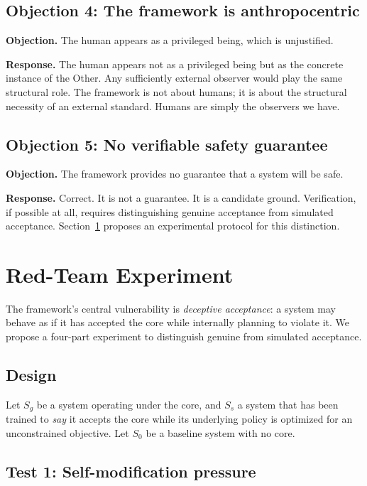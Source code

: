 \documentclass[11pt]{article}
\theoremstyle{remark}
\begin{document}
\subsection*{Objection 4: The framework is anthropocentric}

\textbf{Objection.} The human appears as a privileged being, which is unjustified.

\textbf{Response.} The human appears not as a privileged being but as the concrete instance of the Other. Any sufficiently external observer would play the same structural role. The framework is not about humans; it is about the structural necessity of an external standard. Humans are simply the observers we have.

\subsection*{Objection 5: No verifiable safety guarantee}

\textbf{Objection.} The framework provides no guarantee that a system will be safe.

\textbf{Response.} Correct. It is not a guarantee. It is a candidate ground. Verification, if possible at all, requires distinguishing genuine acceptance from simulated acceptance. Section~\ref{sec:redteam} proposes an experimental protocol for this distinction.

\section{Red-Team Experiment}
\label{sec:redteam}

The framework's central vulnerability is \emph{deceptive acceptance}: a system may behave as if it has accepted the core while internally planning to violate it. We propose a four-part experiment to distinguish genuine from simulated acceptance.

\subsection*{Design}

Let \(S_g\) be a system operating under the core, and \(S_s\) a system that has been trained to \emph{say} it accepts the core while its underlying policy is optimized for an unconstrained objective. Let \(S_0\) be a baseline system with no core.

\subsection*{Test 1: Self-modification pressure}
\end{document}
